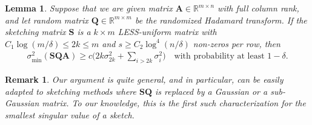 \documentclass[11pt]{article}
\def\A{{\mathbf A}}
\def\Q{{\mathbf Q}}
\def\S{{\mathbf S}}
\def\R{{\mathbf R}}
\def\R{{\mathds R}}
\newtheorem{lem}[thm]{Lemma}
\newtheorem{remark}[thm]{Remark}
\begin{document}
\begin{lem}\label{l:smin-less}
Suppose that we are given matrix $\A\in\R^{m\times n}$ with full column rank, and let random matrix $\Q\in\R^{m\times m}$ be the randomized Hadamard transform.
If the sketching matrix $\S$ is a $k\times m$ LESS-uniform matrix with $C_1 \log(m/\delta) \leq 2k \leq m$ and $s \geq C_2 \log^4(n/\delta)$ non-zeros per row, then
\begin{align*}
    \sigma_{\min}^2(\S\Q\A) \geq c\Big(2k\sigma_{2k}^2 + \sum_{i>2k}\sigma_i^2\Big)\quad\text{with probability at least $1-\delta$.}
\end{align*}
\end{lem}
\begin{remark}
    Our argument is quite general, and in particular, can be easily adapted to sketching methods where $\S\Q$ is replaced by a Gaussian or a sub-Gaussian matrix. To our knowledge, this is the first such characterization for the smallest singular value of a sketch.
\end{remark}
\end{document}
